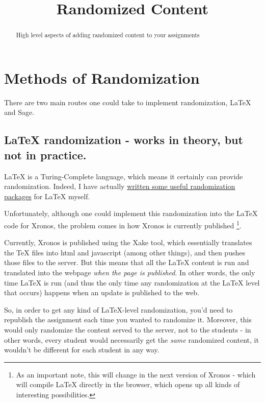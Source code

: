 \documentclass{ximera}
\title{Randomized Content}
\begin{document}
\begin{abstract}
    High level aspects of adding randomized content to your assignments
\end{abstract}
\maketitle

\section*{Methods of Randomization}
    There are two main routes one could take to implement randomization, LaTeX and Sage. 
    
    \subsection*{LaTeX randomization - works in theory, but not in practice.}
        \LaTeX{} is a Turing-Complete language, which means it certainly can provide randomization. Indeed, I have actually \href{https://github.com/xronosuf/Xronos-Latex-Package/blob/master/OptionalPackages/randomize.sty}{written some useful randomization packages} for LaTeX myself.
        
        Unfortunately, although one could implement this randomization into the LaTeX code for Xronos, the problem comes in how Xronos is currently published%
        \footnote{As an important note, this will change in the next version of Xronos - which will compile LaTeX directly in the browser, which opens up all kinds of interesting possibilities.}.
        
        Currently, Xronos is published using the Xake tool, which essentially translates the TeX files into html and javascript (among other things), and then pushes those files to the server. But this means that all the LaTeX content is run and translated into the webpage \textit{when the page is published}. In other words, the only time LaTeX is run (and thus the only time any randomization at the LaTeX level that occurs) happens when an update is published to the web.
        
        So, in order to get any kind of LaTeX-level randomization, you'd need to republish the assignment each time you wanted to randomize it. Moreover, this would only randomize the content served to the server, not to the students - in other words, every student would necessarily get the \textit{same} randomized content, it wouldn't be different for each student in any way.
        
\end{document}
